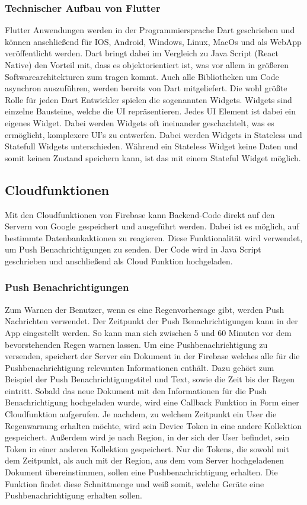\subsubsection{Technischer Aufbau von Flutter}
Flutter Anwendungen werden in der Programmiersprache Dart geschrieben und können anschließend für IOS, Android, Windows, Linux, MacOs und als WebApp 
veröffentlicht werden. Dart bringt dabei im Vergleich zu Java Script (React Native) den Vorteil mit, dass es objektorientiert ist, was vor allem in größeren 
Softwarearchitekturen zum tragen kommt. Auch alle Bibliotheken um Code asynchron auszuführen, werden bereits von Dart mitgeliefert. 
Die wohl größte Rolle für jeden Dart Entwickler spielen die sogenannten Widgets. Widgets sind einzelne Bausteine, welche die UI repräsentieren. 
Jedes UI Element ist dabei ein eigenes Widget. Dabei werden Widgets oft ineinander geschachtelt, was es ermöglicht, komplexere UI’s zu entwerfen. 
Dabei werden Widgets in Stateless und Statefull Widgets unterschieden. Während ein Stateless Widget keine Daten und somit keinen Zustand speichern kann, 
ist das mit einem Stateful Widget möglich.

\subsection{Cloudfunktionen}
Mit den Cloudfunktionen von Firebase kann Backend-Code direkt auf den Servern von Google gespeichert und ausgeführt werden. 
Dabei ist es möglich, auf bestimmte Datenbankaktionen zu reagieren. 
Diese Funktionalität wird verwendet, um Push Benachrichtigungen zu senden. 
Der Code wird in Java Script geschrieben und anschließend als Cloud Funktion hochgeladen.

\subsubsection{Push Benachrichtigungen}\label{sec:Pushbenachrichtigungen}
Zum Warnen der Benutzer, wenn es eine Regenvorhersage gibt, werden Push Nachrichten verwendet. 
Der Zeitpunkt der Push Benachrichtigungen kann in der App eingestellt werden. 
So kann man sich zwischen 5 und 60 Minuten vor dem bevorstehenden Regen warnen lassen.  
Um eine Pushbenachrichtigung zu versenden, speichert der Server ein Dokument in der Firebase welches alle für die 
Pushbenachrichtigung relevanten Informationen enthält. 
Dazu gehört zum Beispiel der Push Benachrichtigungstitel und Text, sowie die Zeit bis der Regen eintritt.
Sobald das neue Dokument mit den Informationen für die Push Benachrichtigung hochgeladen wurde, wird eine Callback 
Funktion in Form einer Cloudfunktion aufgerufen.
Je nachdem, zu welchem Zeitpunkt ein User die Regenwarnung erhalten möchte, wird sein Device Token in eine andere 
Kollektion gespeichert.   
Außerdem wird je nach Region, in der sich der User befindet, sein Token in einer anderen Kollektion gespeichert. 
Nur die Tokens, die sowohl mit dem Zeitpunkt, als auch mit der Region, aus dem vom Server hochgeladenen Dokument übereinstimmen, 
sollen eine Pushbenachrichtigung erhalten. 
Die Funktion findet diese Schnittmenge und weiß somit, welche Geräte eine Pushbenachrichtigung erhalten sollen.

